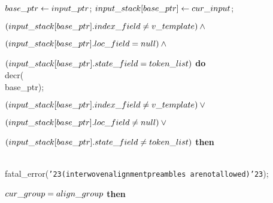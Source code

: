 {{\ninepoint\noindent
{} $\\{base\_ptr}\gets\\{input\_ptr}$;
 $\\{input\_stack}[\\{base\_ptr}]\gets\\{cur\_input}$;\par\noindent
{} $(\\{input\_stack}[\\{base\_ptr}].\\{index\_field}\ne
  \\{v\_template}) \land{}$\par\noindent
\quad\qquad $(\\{input\_stack}[\\{base\_ptr}].\\{loc\_field}=
  \\{null}) \land {}$\par\noindent
\quad\qquad $(\\{input\_stack}[\\{base\_ptr}].\\{state\_field}=
  \\{token\_list})$ {\bf do} \\{decr}(\\{base\_ptr});\par\noindent
{} $(\\{input\_stack}[\\{base\_ptr}].\\{index\_field}\ne
  \\{v\_template}) \lor {}$\par\noindent
\quad\qquad $(\\{input\_stack}[\\{base\_ptr}].\\{loc\_field}\ne
  \\{null}) \lor {}$\par\noindent
\quad\qquad $(\\{input\_stack}[\\{base\_ptr}].\\{state\_field}\ne
  \\{token\_list})$ {\bf then}\par\noindent
\qquad\\{fatal\_error}(\hbox{\tt\char'23(interwoven\]alignment\]preambles\]%
    are\]not\]allowed)\char'23});\par\noindent
{} $\\{cur\_group}=\\{align\_group}$ {\bf then}

}}
